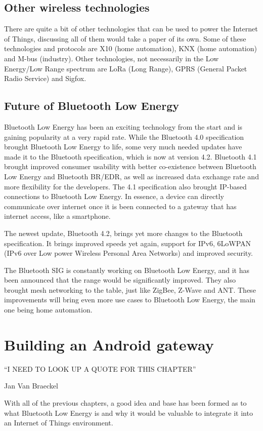 \documentclass[pdftex,a4paper,12pt,twoside]{report}
\begin{document}
\section{Other wireless technologies}
\label{sec:othertechnologies}
There are quite a bit of other technologies that can be used to power the Internet of Things, discussing all of them would take a paper of its own. Some of these technologies and protocols are X10 (home automation), KNX (home automation) and M-bus (industry). Other technologies, not necessarily in the Low Energy/Low Range spectrum are LoRa (Long Range), GPRS (General Packet Radio Service) and Sigfox.

\section{Future of Bluetooth Low Energy}
\label{sec:futureble}
Bluetooth Low Energy has been an exciting technology from the start and is gaining popularity at a very rapid rate. While the Bluetooth 4.0 specification brought Bluetooth Low Energy to life, some very much needed updates have made it to the Bluetooth specification, which is now at version 4.2. Bluetooth 4.1 brought improved consumer usability with better co-existence between Bluetooth Low Energy and Bluetooth BR/EDR, as well as increased data exchange rate and more flexibility for the developers. The 4.1 specification also brought IP-based connections to Bluetooth Low Energy. In essence, a device can directly communicate over internet once it is been connected to a gateway that has internet access, like a smartphone.

The newest update, Bluetooth 4.2, brings yet more changes to the Bluetooth specification. It brings improved speeds yet again, support for IPv6, 6LoWPAN (IPv6 over Low power Wireless Personal Area Networks) and improved security.

The Bluetooth SIG is constantly working on Bluetooth Low Energy, and it has been announced that the range would be significantly improved. They also brought mesh networking to the table, just like ZigBee, Z-Wave and ANT. These improvements will bring even more use cases to Bluetooth Low Energy, the main one being home automation.

\chapter{Building an Android gateway}
\label{ch:android}
\epigraph{``I NEED TO LOOK UP A QUOTE FOR THIS CHAPTER''}{Jan Van Braeckel}
With all of the previous chapters, a good idea and base has been formed as to what Bluetooth Low Energy is and why it would be valuable to integrate it into an Internet of Things environment.
\end{document}
